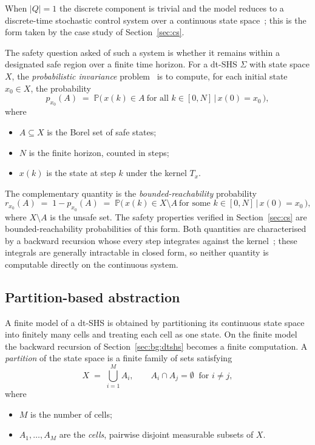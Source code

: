 \documentclass[11pt,a4paper]{article}
\newcommand{\Prob}{\mathbb{P}}
\theoremstyle{plain}
\theoremstyle{remark}
\begin{document}
	When $|Q| = 1$ the discrete component is trivial and the model reduces to a discrete-time stochastic control system over a continuous state space~\cite[Def.~1.3]{LSAZ22}; this is the form taken by the case study of Section~\ref{sec:cs}.
	
	The safety question asked of such a system is whether it remains within a designated safe region over a finite time horizon. For a dt-SHS $\Sigma$ with state space $X$, the \emph{probabilistic invariance} problem~\cite{APLS08} is to compute, for each initial state $x_0 \in X$, the probability
	\begin{equation}
		p_{x_0}(A) \;=\; \Prob\bigl(\,x(k) \in A\ \text{for all } k \in [0, N] \,\big|\, x(0) = x_0\,\bigr),
		\label{eq:invariance}
	\end{equation}
	where
	\begin{itemize}
		\item $A \subseteq X$ is the Borel set of safe states;
		\item $N$ is the finite horizon, counted in steps;
		\item $x(k)$ is the state at step $k$ under the kernel $T_x$.
	\end{itemize}
	The complementary quantity is the \emph{bounded-reachability} probability
	\begin{equation}
		r_{x_0}(A) \;=\; 1 - p_{x_0}(A) \;=\; \Prob\bigl(\,x(k) \in X \setminus A\ \text{for some } k \in [0, N] \,\big|\, x(0) = x_0\,\bigr),
		\label{eq:reach}
	\end{equation}
	where $X \setminus A$ is the unsafe set. The safety properties verified in Section~\ref{sec:cs} are bounded-reachability probabilities of this form. Both quantities are characterised by a backward recursion whose every step integrates against the kernel~\cite[Thm.~1]{APLS08}; these integrals are generally intractable in closed form, so neither quantity is computable directly on the continuous system.
	
	\subsection{Partition-based abstraction}
	\label{sec:bg:grid}
	
	A finite model of a dt-SHS is obtained by partitioning its continuous state space into finitely many cells and treating each cell as one state. On the finite model the backward recursion of Section~\ref{sec:bg:dtshs} becomes a finite computation. A \emph{partition} of the state space is a finite family of sets satisfying
	\begin{equation}
		X \;=\; \bigcup_{i=1}^{M} A_i, \qquad A_i \cap A_j = \emptyset \ \text{ for } i \neq j,
		\label{eq:partition-bg}
	\end{equation}
	where
	\begin{itemize}
		\item $M$ is the number of cells;
		\item $A_1, \ldots, A_M$ are the \emph{cells}, pairwise disjoint measurable subsets of $X$.
	\end{itemize}
	
\end{document}
